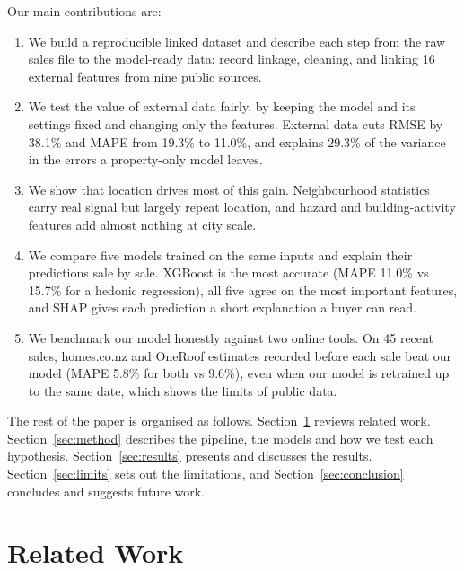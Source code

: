 \documentclass[conference]{IEEEtran}
\begin{document}
Our main contributions are:
\begin{enumerate}
  \item We build a reproducible linked dataset and describe each step
  from the raw sales file to the model-ready data: record linkage,
  cleaning, and linking 16 external features from nine public sources.
  \item We test the value of external data fairly, by keeping the model
  and its settings fixed and changing only the features. External data
  cuts RMSE by 38.1\% and MAPE from 19.3\% to 11.0\%, and explains
  29.3\% of the variance in the errors a property-only model leaves.
  \item We show that location drives most of this gain. Neighbourhood
  statistics carry real signal but largely repeat location, and hazard
  and building-activity features add almost nothing at city scale.
  \item We compare five models trained on the same inputs and explain
  their predictions sale by sale. XGBoost is the most accurate (MAPE
  11.0\% vs 15.7\% for a hedonic regression), all five agree on the most
  important features, and SHAP gives each prediction a short explanation
  a buyer can read.
  \item We benchmark our model honestly against two online tools. On 45
  recent sales, homes.co.nz and OneRoof estimates recorded before each
  sale beat our model (MAPE 5.8\% for both vs 9.6\%), even when our model
  is retrained up to the same date, which shows the limits of public
  data.
\end{enumerate}

The rest of the paper is organised as follows.
Section~\ref{sec:related} reviews related work.
Section~\ref{sec:method} describes the pipeline, the models and how we
test each hypothesis. Section~\ref{sec:results} presents and discusses
the results. Section~\ref{sec:limits} sets out the limitations, and
Section~\ref{sec:conclusion} concludes and suggests future work.

\section{Related Work}\label{sec:related}
\end{document}
